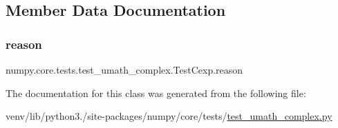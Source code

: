 \subsection{Member Data Documentation}
\mbox{\label{classnumpy_1_1core_1_1tests_1_1test__umath__complex_1_1TestCexp_adeb6376f7928608e38b0eb59fd84ae50}} 
\subsubsection{\texorpdfstring{reason}{reason}}
{\footnotesize\ttfamily numpy.\+core.\+tests.\+test\+\_\+umath\+\_\+complex.\+Test\+Cexp.\+reason\hspace{0.3cm}{\ttfamily [static]}}



The documentation for this class was generated from the following file\+:\begin{DoxyCompactItemize}
\item 
venv/lib/python3./site-\/packages/numpy/core/tests/\hyperlink{test__umath__complex_8py}{test\+\_\+umath\+\_\+complex.\+py}\end{DoxyCompactItemize}
